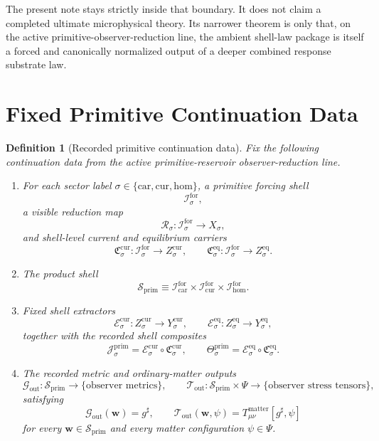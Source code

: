 \documentclass[11pt]{article}
\newcommand{\CompletedMetric}{g^{\sharp}}
\newcommand{\Car}{\mathrm{car}}
\newcommand{\Cur}{\mathrm{cur}}
\newcommand{\Hom}{\mathrm{hom}}
\newcommand{\ForSpace}[1]{\mathcal I_{#1}^{\mathrm{for}}}
\newcommand{\PrimShell}{\mathcal S_{\mathrm{prim}}}
\newcommand{\Reduction}[1]{\mathcal R_{#1}}
\newcommand{\CurrentCarrier}[1]{\mathfrak C_{#1}^{\mathrm{cur}}}
\newcommand{\EqCarrier}[1]{\mathfrak C_{#1}^{\mathrm{eq}}}
\newcommand{\CurrentExtract}[1]{\mathscr E_{#1}^{\mathrm{cur}}}
\newcommand{\EqExtract}[1]{\mathscr E_{#1}^{\mathrm{eq}}}
\newcommand{\PrimCurrent}[1]{\mathcal J_{#1}^{\mathrm{prim}}}
\newcommand{\PrimTheta}[1]{\Theta_{#1}^{\mathrm{prim}}}
\newcommand{\MetricOut}{\mathscr G_{\mathrm{out}}}
\newcommand{\MatterOut}{\mathscr T_{\mathrm{out}}}
\newtheorem{definition}{Definition}
\begin{document}
The present note stays strictly inside that boundary. It does not claim a completed ultimate microphysical theory. Its narrower theorem is only that, on the active primitive-observer-reduction line, the ambient shell-law package is itself a forced and canonically normalized output of a deeper combined response substrate law.

\section{Fixed Primitive Continuation Data}

\begin{definition}[Recorded primitive continuation data]
\label{def:fixed}
Fix the following continuation data from the active primitive-reservoir observer-reduction line.
\begin{enumerate}
    \item For each sector label \(\sigma\in\{\Car,\Cur,\Hom\}\), a primitive forcing shell
    \[
    \ForSpace{\sigma},
    \]
    a visible reduction map
    \[
    \Reduction{\sigma}:\ForSpace{\sigma}\to X_{\sigma},
    \]
    and shell-level current and equilibrium carriers
    \[
    \CurrentCarrier{\sigma}:\ForSpace{\sigma}\to Z_{\sigma}^{\mathrm{cur}},
    \qquad
    \EqCarrier{\sigma}:\ForSpace{\sigma}\to Z_{\sigma}^{\mathrm{eq}}.
    \]
    \item The product shell
    \[
    \PrimShell
    \equiv
    \ForSpace{\Car}\times \ForSpace{\Cur}\times \ForSpace{\Hom}.
    \]
    \item Fixed shell extractors
    \[
    \CurrentExtract{\sigma}:Z_{\sigma}^{\mathrm{cur}}\to Y_{\sigma}^{\mathrm{cur}},
    \qquad
    \EqExtract{\sigma}:Z_{\sigma}^{\mathrm{eq}}\to Y_{\sigma}^{\mathrm{eq}},
    \]
    together with the recorded shell composites
    \begin{equation}
    \PrimCurrent{\sigma}
    =
    \CurrentExtract{\sigma}\circ \CurrentCarrier{\sigma},
    \qquad
    \PrimTheta{\sigma}
    =
    \EqExtract{\sigma}\circ \EqCarrier{\sigma}.
    \label{eq:primcomposites}
    \end{equation}
    \item The recorded metric and ordinary-matter outputs
    \[
    \MetricOut:\PrimShell\to\{\text{observer metrics}\},
    \qquad
    \MatterOut:\PrimShell\times\Psi\to\{\text{observer stress tensors}\},
    \]
    satisfying
    \begin{equation}
    \MetricOut(\mathbf w)=\CompletedMetric,
    \qquad
    \MatterOut(\mathbf w,\psi)
    =
    T_{\mu\nu}^{\mathrm{matter}}[\CompletedMetric,\psi]
    \label{eq:fixedoutputs}
    \end{equation}
    for every \(\mathbf w\in\PrimShell\) and every matter configuration \(\psi\in\Psi\).
\end{enumerate}
\end{definition}
\end{document}
